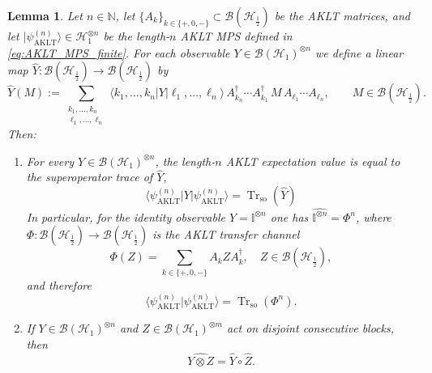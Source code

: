 \documentclass[11pt,a4paper]{article}
\newtheorem{lemma}[theorem]{Lemma}
\begin{document}
\begin{lemma}\label{lem:hatY_properties}
Let \(n\in\mathbb{N}\), let \(\{A_k\}_{k\in\{+,0,-\}}\subset\mathcal{B}(\mathcal{H}_{\frac{1}{2}})\) be the AKLT matrices, and let \(|\psi_{\mathrm{AKLT}}^{(n)}\rangle\in\mathcal{H}_{1}^{\otimes n}\) be the length-\(n\) AKLT MPS defined in \eqref{eq:AKLT_MPS_finite}. For each observable \(Y\in\mathcal{B}(\mathcal{H}_{1})^{\otimes n}\) we define a linear map \(\widehat{Y}:\mathcal{B}(\mathcal{H}_{\frac{1}{2}})\to\mathcal{B}(\mathcal{H}_{\frac{1}{2}})\) by
\begin{equation}\label{eq:hatY_def_lemma}
\widehat{Y}(M)
:=
\sum_{\substack{k_1,\dots,k_n\\ \ell_1,\dots,\ell_n}}
\langle k_1,\dots,k_n|Y|\ell_1,\dots,\ell_n\rangle\,
A_{k_n}^{\dagger}\cdots A_{k_1}^{\dagger}\,M\,A_{\ell_1}\cdots A_{\ell_n},
\qquad M\in\mathcal{B}(\mathcal{H}_{\frac{1}{2}}).
\end{equation}
Then:
\begin{enumerate}
\item[(a)] For every \(Y\in\mathcal{B}(\mathcal{H}_{1})^{\otimes n}\), the length-\(n\) AKLT expectation value is equal to the superoperator trace of \(\widehat{Y}\),
\begin{equation}\label{eq:AKLT_expectation_hatY_correct}
\langle\psi_{\mathrm{AKLT}}^{(n)}|Y|\psi_{\mathrm{AKLT}}^{(n)}\rangle
=
\operatorname{Tr}_{\mathrm{so}}(\widehat{Y})
\end{equation}
  In particular, for the identity observable \(Y=\mathbb{I}^{\otimes n}\) one has \(\widehat{\mathbb{I}^{\otimes n}}=\Phi^{n}\), where \(\Phi:\mathcal{B}(\mathcal{H}_{\frac{1}{2}})\to\mathcal{B}(\mathcal{H}_{\frac{1}{2}})\) is the AKLT transfer channel
\[
\Phi(Z)=\sum_{k\in\{+,0,-\}}A_k Z A_k^{\dagger},\quad Z\in\mathcal{B}(\mathcal{H}_{\frac{1}{2}}),
\]
and therefore
\[
\langle\psi_{\mathrm{AKLT}}^{(n)}|\psi_{\mathrm{AKLT}}^{(n)}\rangle
=
\operatorname{Tr}_{\mathrm{so}}(\Phi^{n}).
\]

\item[(b)] If \(Y\in\mathcal{B}(\mathcal{H}_{1})^{\otimes n}\) and \(Z\in\mathcal{B}(\mathcal{H}_{1})^{\otimes m}\) act on disjoint consecutive blocks, then
\begin{equation}\label{eq:hatY_composition}
\widehat{Y\otimes Z}
=
\widehat{Y}\circ\widehat{Z}.
\end{equation}
\end{enumerate}
\end{lemma}
\end{document}

